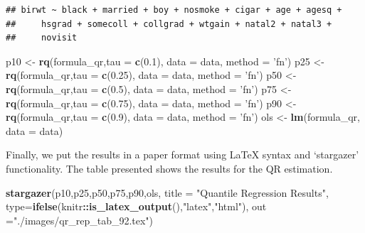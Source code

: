 \documentclass[]{book}
\newenvironment{Shaded}{\begin{snugshade}}{\end{snugshade}}
\newcommand{\KeywordTok}[1]{\textcolor[rgb]{0.13,0.29,0.53}{\textbf{#1}}}
\newcommand{\DataTypeTok}[1]{\textcolor[rgb]{0.13,0.29,0.53}{#1}}
\newcommand{\FloatTok}[1]{\textcolor[rgb]{0.00,0.00,0.81}{#1}}
\newcommand{\StringTok}[1]{\textcolor[rgb]{0.31,0.60,0.02}{#1}}
\newcommand{\OperatorTok}[1]{\textcolor[rgb]{0.81,0.36,0.00}{\textbf{#1}}}
\newcommand{\NormalTok}[1]{#1}
\begin{document}
\begin{verbatim}
## birwt ~ black + married + boy + nosmoke + cigar + age + agesq + 
##     hsgrad + somecoll + collgrad + wtgain + natal2 + natal3 + 
##     novisit
\end{verbatim}

\begin{Shaded}
\begin{Highlighting}[]
\NormalTok{p10 <-}\StringTok{ }\KeywordTok{rq}\NormalTok{(formula_qr,}\DataTypeTok{tau =} \KeywordTok{c}\NormalTok{(}\FloatTok{0.1}\NormalTok{), }\DataTypeTok{data =}\NormalTok{ data, }\DataTypeTok{method =} \StringTok{'fn'}\NormalTok{)}
\NormalTok{p25 <-}\StringTok{ }\KeywordTok{rq}\NormalTok{(formula_qr,}\DataTypeTok{tau =} \KeywordTok{c}\NormalTok{(}\FloatTok{0.25}\NormalTok{), }\DataTypeTok{data =}\NormalTok{ data, }\DataTypeTok{method =} \StringTok{'fn'}\NormalTok{)}
\NormalTok{p50 <-}\StringTok{ }\KeywordTok{rq}\NormalTok{(formula_qr,}\DataTypeTok{tau =} \KeywordTok{c}\NormalTok{(}\FloatTok{0.5}\NormalTok{), }\DataTypeTok{data =}\NormalTok{ data, }\DataTypeTok{method =} \StringTok{'fn'}\NormalTok{)}
\NormalTok{p75 <-}\StringTok{ }\KeywordTok{rq}\NormalTok{(formula_qr,}\DataTypeTok{tau =} \KeywordTok{c}\NormalTok{(}\FloatTok{0.75}\NormalTok{), }\DataTypeTok{data =}\NormalTok{ data, }\DataTypeTok{method =} \StringTok{'fn'}\NormalTok{)}
\NormalTok{p90 <-}\StringTok{ }\KeywordTok{rq}\NormalTok{(formula_qr,}\DataTypeTok{tau =} \KeywordTok{c}\NormalTok{(}\FloatTok{0.9}\NormalTok{), }\DataTypeTok{data =}\NormalTok{ data, }\DataTypeTok{method =} \StringTok{'fn'}\NormalTok{)}
\NormalTok{ols <-}\StringTok{ }\KeywordTok{lm}\NormalTok{(formula_qr, }\DataTypeTok{data =}\NormalTok{ data)}
\end{Highlighting}
\end{Shaded}

Finally, we put the results in a paper format using LaTeX syntax and
`stargazer' functionality. The table presented shows the results for the
QR estimation.

\begin{Shaded}
\begin{Highlighting}[]
\KeywordTok{stargazer}\NormalTok{(p10,p25,p50,p75,p90,ols, }\DataTypeTok{title =} \StringTok{"Quantile Regression Results"}\NormalTok{, }
          \DataTypeTok{type=}\KeywordTok{ifelse}\NormalTok{(knitr}\OperatorTok{::}\KeywordTok{is_latex_output}\NormalTok{(),}\StringTok{"latex"}\NormalTok{,}\StringTok{"html"}\NormalTok{), }\DataTypeTok{out =}\StringTok{"./images/qr_rep_tab_92.tex"}\NormalTok{)}
\end{Highlighting}
\end{Shaded}
\end{document}
